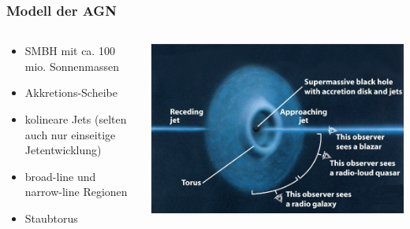 \documentclass[aspectratio=1610, 9pt]{beamer}
\begin{document}
\begin{frame}\frametitle{Modell der AGN}
  \begin{columns}
  \begin{column}[c]{0.45\textwidth}
  \begin{itemize}
    \item SMBH mit ca. 100 mio. Sonnenmassen
    \item Akkretions-Scheibe
    \item kolineare Jets (selten auch nur einseitige Jetentwicklung)
    \item broad-line und narrow-line Regionen
    \item Staubtorus
  \end{itemize}
  \end{column}
  \begin{column}[c]{0.45\textwidth}
    \includegraphics{images/agn-pic.png}
  \end{column}
  \end{columns}
\end{frame}
\end{document}
